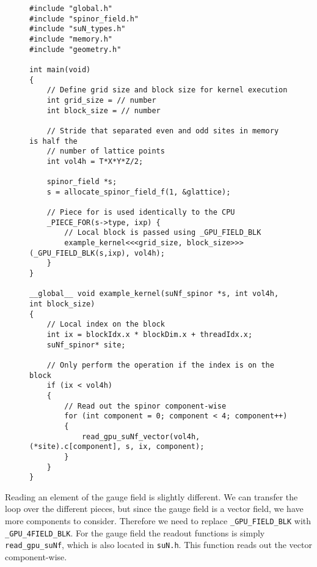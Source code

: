\documentclass[12pt]{article}
\begin{document}
\begin{figure}[H]
\begin{lstlisting}[caption=Example for reading the field values of a spinor]
#include "global.h"
#include "spinor_field.h"
#include "suN_types.h"
#include "memory.h"
#include "geometry.h"

int main(void)
{
    // Define grid size and block size for kernel execution
    int grid_size = // number
    int block_size = // number

    // Stride that separated even and odd sites in memory is half the
    // number of lattice points
    int vol4h = T*X*Y*Z/2;

    spinor_field *s;
    s = allocate_spinor_field_f(1, &glattice);

    // Piece for is used identically to the CPU
    _PIECE_FOR(s->type, ixp) {
        // Local block is passed using _GPU_FIELD_BLK
        example_kernel<<<grid_size, block_size>>>(_GPU_FIELD_BLK(s,ixp), vol4h);
    }
}

__global__ void example_kernel(suNf_spinor *s, int vol4h, int block_size)
{
    // Local index on the block
    int ix = blockIdx.x * blockDim.x + threadIdx.x;
    suNf_spinor* site;

    // Only perform the operation if the index is on the block
    if (ix < vol4h)
    {
        // Read out the spinor component-wise
        for (int component = 0; component < 4; component++)
        {
            read_gpu_suNf_vector(vol4h, (*site).c[component], s, ix, component);
        }
    }
}
\end{lstlisting}
\end{figure}

Reading an element of the gauge field is slightly different. We can transfer the loop over the different pieces, but since the gauge field is a vector field, we have more components to consider. Therefore we need to replace \texttt{\_GPU\_FIELD\_BLK} with \texttt{\_GPU\_4FIELD\_BLK}. For the gauge field the readout functions is simply \texttt{read\_gpu\_suNf}, which is also located in \texttt{suN.h}. This function reads out the vector component-wise.
\end{document}
